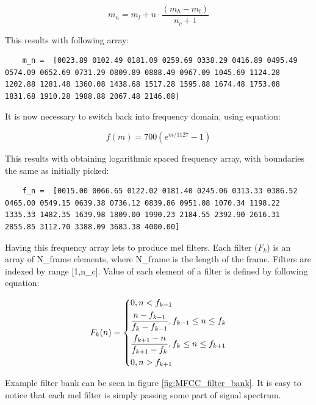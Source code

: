 \documentclass[magister]{dyplom}
\begin{document}
	\begin{equation}
		m_n = m_l + n \cdot \frac{(m_h - m_l)}{n_c + 1}
	\end{equation}
	
	This results with following array:
	
	\begin{verbatim}
	m_n =  [0023.89	0102.49	0181.09	0259.69	0338.29	0416.89	0495.49	0574.09	0652.69	0731.29	0809.89	0888.49	0967.09	1045.69	1124.28	1202.88	1281.48	1360.08	1438.68	1517.28	1595.88	1674.48	1753.08	1831.68	1910.28	1988.88	2067.48	2146.08]
	\end{verbatim}
	
	It is now necessary to switch back into frequency domain, using equation:
	
	\begin{equation}
		f(m) = 700 \left(e^{m/1127} - 1 \right)
	\end{equation}
	
	This results with obtaining logarithmic spaced frequency array, with boundaries the same as initially picked:
	
	\begin{verbatim}
	f_n =  [0015.00	0066.65	0122.02	0181.40	0245.06	0313.33	0386.52	0465.00	0549.15	0639.38	0736.12	0839.86	0951.08	1070.34	1198.22	1335.33	1482.35	1639.98	1809.00	1990.23	2184.55	2392.90	2616.31	2855.85	3112.70	3388.09	3683.38	4000.00]	
	\end{verbatim}
	
	Having this frequency array lets to produce mel filters. Each filter ($F_k$) is an array of \gls{N_frame} elements, where \gls{N_frame} is the length of the frame. Filters are indexed by range [1,\gls{n_c}]. Value of each element of a filter is defined by following equation:
	
	\begin{equation}
	F_k(n) = \begin{dcases}
				0, n < f_{k-1} \\
				\frac{n - f_{k-1}}{f_k - f_{k-1}}, f_{k-1} \leq n \leq f_k \\
				\frac{f_{k+1} - n}{f_{k+1} - f_k}, f_k \leq n \leq f_{k+1} \\
				0, n > f_{k+1}					
			 \end{dcases}
	\end{equation}
	
	Example filter bank can be seen in figure \ref{fig:MFCC_filter_bank}. It is easy to notice that each mel filter is simply passing some part of signal spectrum.
	
\end{document}

